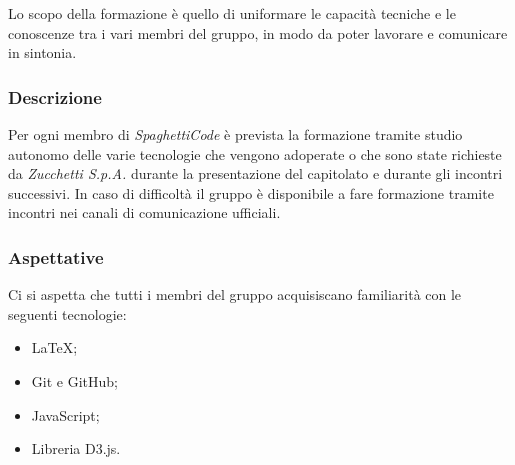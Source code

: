 Lo scopo della formazione è quello di uniformare le capacità tecniche e le conoscenze tra i vari membri del gruppo, in 
modo da poter lavorare e comunicare in sintonia.

\subsubsection{Descrizione}

Per ogni membro di \emph{SpaghettiCode} è prevista la formazione tramite studio autonomo delle varie tecnologie che 
vengono adoperate o che sono state richieste da \emph{Zucchetti S.p.A.} durante la presentazione del capitolato e 
durante gli incontri successivi. In caso di difficoltà il gruppo è disponibile a fare formazione tramite incontri nei 
canali di comunicazione ufficiali.

\subsubsection{Aspettative}

Ci si aspetta che tutti i membri del gruppo acquisiscano familiarità con le seguenti tecnologie:
\begin{itemize}
    \item \LaTeX;
    \item Git e GitHub;
    \item JavaScript;
    \item Libreria D3.js.
\end{itemize}